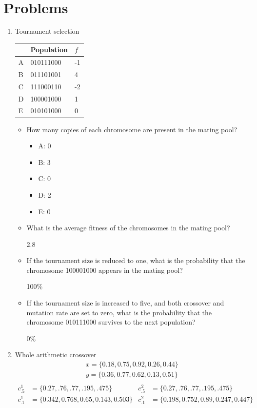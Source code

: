 \documentclass{article}
\begin{document}
\section*{Problems}
\begin{enumerate}
    \item Tournament selection
    \begin{table}[h]
        \centering
        \begin{tabular}{l|l|l}
            & Population & $f$ \\
            \hline
            A & 010111000  & -1 \\
            B & 011101001  & 4 \\
            C & 111000110  & -2 \\
            D & 100001000  & 1 \\
            E & 010101000  & 0
        \end{tabular}
    \end{table}
    \begin{itemize}
        \item How many copies of each chromosome are present in the mating pool?
        \begin{itemize}
            \item A: 0
            \item B: 3
            \item C: 0
            \item D: 2
            \item E: 0
        \end{itemize}
        \item What is the average fitness of the chromosomes in the mating pool?

        2.8

        \item If the tournament size is reduced to one, what is the probability that the chromosome 100001000 appears in the mating pool?

        100\%

        \item If the tournament size is increased to five, and both crossover and mutation rate are set to zero, what is the probability that the chromosome 010111000 survives to the next population?

        0\%

    \end{itemize}

    \item Whole arithmetic crossover
    \begin{align*}
        x=\{ 0.18, 0.75, 0.92, 0.26, 0.44 \}\\
        y=\{ 0.36, 0.77, 0.62, 0.13, 0.51 \}\\
    \end{align*}
    \begin{align*}
        c^{1}_{.5} &= \{ 0.27, .76, .77, .195, .475 \} & c^{2}_{.5} &= \{ 0.27, .76, .77, .195, .475 \}\\
        c^1_{.1} &= \{ 0.342, 0.768, 0.65, 0.143 ,0.503 \} & c^2_{.1} &= \{ 0.198, 0.752, 0.89, 0.247 ,0.447\}\\
    \end{align*}


\end{enumerate}
\end{document}
